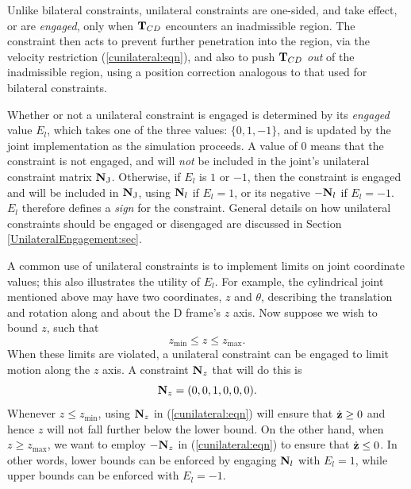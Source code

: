 Unlike bilateral constraints, unilateral constraints are one-sided,
and take effect, or are {\it engaged}, only when ${\bf T}_{CD}$ encounters
an inadmissible region.  The constraint then acts to prevent further
penetration into the region, via the velocity restriction
(\ref{cunilateral:eqn}), and also to push ${\bf T}_{CD}$ {\it out} of the
inadmissible region, using a position correction analogous to that
used for bilateral constraints.

Whether or not a unilateral constraint is engaged is determined by its
{\it engaged} value $E_l$, which takes one of the three values:
$\{0, 1, -1\}$, and is updated by the joint implementation as the
simulation proceeds.  A value of 0 means that the constraint is not
engaged, and will {\it not} be included in the joint's unilateral
constraint matrix ${\bf N}_\text{J}$. Otherwise, if $E_l$ is $1$ or $-1$, then the
constraint is engaged and will be included in ${\bf N}_\text{J}$, using ${\bf N}_l$ if
$E_l = 1$, or its negative $-{\bf N}_l$ if $E_l = -1$. $E_l$ therefore
defines a {\it sign} for the constraint.  General details on how
unilateral constraints should be engaged or disengaged are discussed
in Section \ref{UnilateralEngagement:sec}.

A common use of unilateral constraints is to implement limits on joint
coordinate values; this also illustrates the utility of $E_l$.  For
example, the cylindrical joint mentioned above may have two
coordinates, $z$ and $\theta$, describing the translation and rotation
along and about the D frame's $z$ axis.  Now suppose we wish to bound
$z$, such that
%
\begin{equation}
z_\text{min} \le z \le z_\text{max}.
\label{zbounds:eqn}
\end{equation}
%
When these limits are violated, a unilateral constraint can be engaged
to limit motion along the $z$ axis.
A constraint ${\bf N}_z$
that will do this is 
%
\begin{equation*}
{\bf N}_z = (0, 0, 1, 0, 0, 0).
\end{equation*}
%
Whenever $z \le z_\text{min}$, using ${\bf N}_z$ in (\ref{cunilateral:eqn})
will ensure that $\dot{{\bf z}} \ge 0$ and hence $z$ will not fall further
below the lower bound.  On the other hand, when $z \ge z_\text{max}$,
we want to employ $-{\bf N}_z$ in (\ref{cunilateral:eqn}) to ensure that
$\dot{{\bf z}} \le 0$. In other words, lower bounds can be enforced by
engaging ${\bf N}_l$ with $E_l = 1$, while upper bounds can be enforced
with $E_l = -1$.


